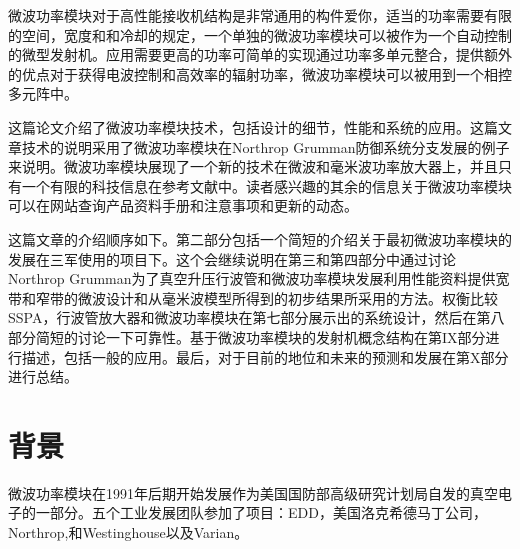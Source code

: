 微波功率模块对于高性能接收机结构是非常通用的构件爱你，适当的功率需要有限的空间，宽度和和冷却的规定，一个单独的微波功率模块可以被作为一个自动控制的微型发射机。应用需要更高的功率可简单的实现通过功率多单元整合，提供额外的优点对于获得电波控制和高效率的辐射功率，微波功率模块可以被用到一个相控多元阵中。

这篇论文介绍了微波功率模块技术，包括设计的细节，性能和系统的应用。这篇文章技术的说明采用了微波功率模块在Northrop Grumman防御系统分支发展的例子来说明。微波功率模块展现了一个新的技术在微波和毫米波功率放大器上，并且只有一个有限的科技信息在参考文献中。读者感兴趣的其余的信息关于微波功率模块可以在网站查询产品资料手册和注意事项和更新的动态。

这篇文章的介绍顺序如下。第二部分包括一个简短的介绍关于最初微波功率模块的发展在三军使用的项目下。这个会继续说明在第三和第四部分中通过讨论Northrop Grumman为了真空升压行波管和微波功率模块发展利用性能资料提供宽带和窄带的微波设计和从毫米波模型所得到的初步结果所采用的方法。权衡比较SSPA，行波管放大器和微波功率模块在第七部分展示出的系统设计，然后在第八部分简短的讨论一下可靠性。基于微波功率模块的发射机概念结构在第IX部分进行描述，包括一般的应用。最后，对于目前的地位和未来的预测和发展在第X部分进行总结。

\section{背景}

微波功率模块在1991年后期开始发展作为美国国防部高级研究计划局自发的真空电子的一部分。五个工业发展团队参加了项目：EDD，美国洛克希德马丁公司，Northrop,和Westinghouse以及Varian。